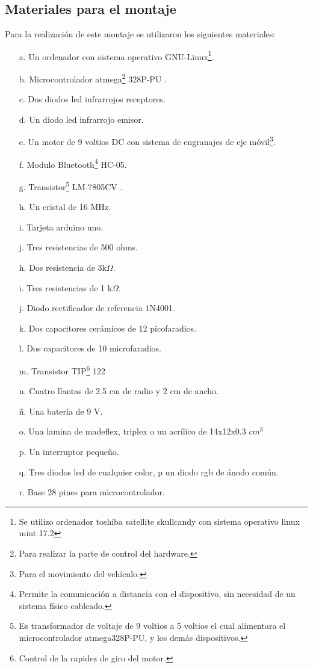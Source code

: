 \documentclass[12]{article}
\begin{document}
\begin{multicols}{2}
\subsection{ Materiales para el montaje}
Para la realización de este montaje se utilizaron los siguientes materiales:
\begin{enumerate}
\item[a.] Un ordenador con sistema operativo GNU-Linux\footnote{Se utilizo ordenador toshiba satellite skullcandy con sistema operativo linux mint 17.2}.
\item[b.] Microcontrolador atmega\footnote{Para realizar la parte de control del hardware.} 328P-PU \cite{ARDUINO}.
\item[c.] Dos diodos led infrarrojos receptores.
\item[d.] Un diodo led infrarrojo emisor.
\item[e.] Un motor de 9 voltios DC con sistema de engranajes de eje móvil\footnote{Para el movimiento del vehículo.}.
\item[f.] Modulo Bluetooth\footnote{Permite la comunicación a distancia con el dispositivo, sin necesidad de un sistema físico cableado.} HC-05.
\item[g.] Transistor\footnote{Es transformador de voltaje de 9 voltios a 5 voltios el cual alimentara el microcontrolador atmega328P-PU, y los demás dispositivos.} LM-7805CV \cite{REGULADOR}.
\item[h.] Un cristal de 16 MHz.
\item[i.] Tarjeta arduino \cite{ARDUINO} uno.
\item[j.] Tres resistencias de 500 ohms.
\item[h.] Dos resistencia de 3k$\Omega$.
\item[i.] Tres resistencias de 1 k$\Omega$.
\item[j.] Diodo rectificador de referencia 1N4001. 
\item[k.] Dos capacitores cerámicos de 12 picofaradios.
\item[l.] Dos capacitores de 10 microfaradios.
\item[m.] Transistor TIP\footnote{Control de la rapidez de giro del motor.} 122\cite{TIP122}  
\item[n.] Cuatro llantas de 2.5 cm de radio y 2 cm de ancho.
\item[ñ.] Una batería de 9 V.
\item[o.] Una lamina de madeflex, triplex  o un acrílico de 14x12x0.3 $cm^{3}$
\item[p.] Un interruptor pequeño.
\item[q.] Tres diodos led de cualquier color, p un diodo rgb de ánodo común.
\item[r.] Base 28 pines para microcontrolador.
\end{enumerate}

\end{multicols}
\end{document}
